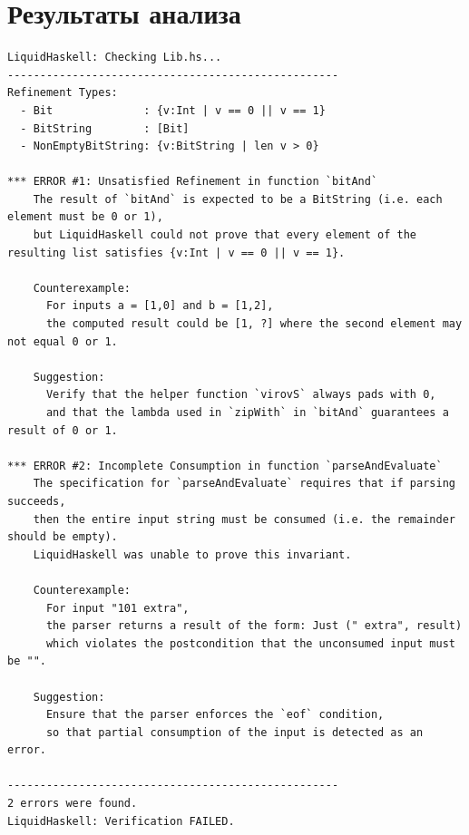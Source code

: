 \documentclass[areasetadvanced]{scrartcl}
\begin{document}
\section{Результаты анализа}
\begin{lstlisting}[caption={Результат анализа}, label=lst:main]
    LiquidHaskell: Checking Lib.hs...
---------------------------------------------------
Refinement Types:
  - Bit              : {v:Int | v == 0 || v == 1}
  - BitString        : [Bit]
  - NonEmptyBitString: {v:BitString | len v > 0}

*** ERROR #1: Unsatisfied Refinement in function `bitAnd`
    The result of `bitAnd` is expected to be a BitString (i.e. each element must be 0 or 1),
    but LiquidHaskell could not prove that every element of the resulting list satisfies {v:Int | v == 0 || v == 1}.
    
    Counterexample:
      For inputs a = [1,0] and b = [1,2],
      the computed result could be [1, ?] where the second element may not equal 0 or 1.
    
    Suggestion:
      Verify that the helper function `virovS` always pads with 0,
      and that the lambda used in `zipWith` in `bitAnd` guarantees a result of 0 or 1.

*** ERROR #2: Incomplete Consumption in function `parseAndEvaluate`
    The specification for `parseAndEvaluate` requires that if parsing succeeds,
    then the entire input string must be consumed (i.e. the remainder should be empty).
    LiquidHaskell was unable to prove this invariant.
    
    Counterexample:
      For input "101 extra",
      the parser returns a result of the form: Just (" extra", result)
      which violates the postcondition that the unconsumed input must be "".
    
    Suggestion:
      Ensure that the parser enforces the `eof` condition,
      so that partial consumption of the input is detected as an error.

---------------------------------------------------
2 errors were found.
LiquidHaskell: Verification FAILED.
\end{lstlisting}
\end{document}
